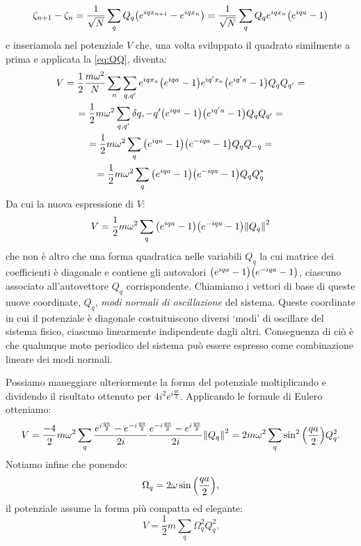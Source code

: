                 $$\zeta_{n+1}-\zeta_n=\frac{1}{\sqrt{N}}\sum_qQ_q\qty(e^{iqx_{n+1}}-e^{iqx_n})=\frac{1}{\sqrt{N}}\sum_qQ_qe^{iqx_n}\qty(e^{iqa}-1)$$
            e inseriamola nel potenziale $V$ che, una volta sviluppato il quadrato similmente a prima e applicata la \eqref{eq:QQ}, diventa:
            \begin{multline*}
                V=\frac{1}{2}\frac{m\omega^2}{N}\sum_n\sum_{q,q'}e^{iqx_n}\qty(e^{iqa}-1)e^{iq'x_n}\bigl(e^{iq'a}-1\bigr)Q_qQ_{q'}=\\=\frac{1}{2}m\omega^2\sum_{q,q'}\delta{q,-q'}\qty(e^{iqa}-1)\bigl(e^{iq'a}-1\bigr)Q_qQ_{q'}=\\=\frac{1}{2}m\omega^2\sum_q\qty(e^{iqa}-1)\qty(e^{-iqa}-1)Q_qQ_{-q}=\\=\frac{1}{2}m\omega^2\sum_q\qty(e^{iqa}-1)\qty(e^{-iqa}-1)Q_qQ_q^*
            \end{multline*}
            Da cui la nuova espressione di $V$:
            \begin{equation}
                V=\frac{1}{2}m\omega^2\sum_q\qty(e^{iqa}-1)\qty(e^{-iqa}-1)\norm{Q_q}^2
            \end{equation}
            che non \`e altro che una forma quadratica nelle variabili $Q_q$ la cui matrice dei coefficienti \`e diagonale e contiene gli autovalori $\qty(e^{iqa}-1)\qty(e^{-iqa}-1)$, ciascuno associato all'autovettore $Q_q$ corrispondente. Chiamiamo i vettori di base di queste nuove coordinate, $Q_q$, \emph{modi normali di oscillazione} del sistema. Queste coordinate in cui il potenziale \`e diagonale costuituiscono diversi `modi' di oscillare del sistema fisico, ciascuno linearmente indipendente dagli altri. Conseguenza di ci\`o \`e che qualunque moto periodico del sistema pu\`o essere espresso come combinazione lineare dei modi normali. \par Possiamo maneggiare ulteriormente la forma del potenziale moltiplicando e dividendo il risultato ottenuto per $\displaystyle 4i^2e^{i\frac{qa}{2}}$. Applicando le formule di Eulero otteniamo:
                $$V=\frac{-4}{2}m\omega^2\sum_q\frac{e^{i\frac{qa}{2}}-e^{-i\frac{qa}{2}}}{2i}\frac{e^{-i\frac{qa}{2}}-e^{i\frac{qa}{2}}}{2i}\norm{Q_q}^2=2m\omega^2\sum_q\sin^2\qty(\frac{qa}{2})Q_q^2.$$
            Notiamo infine che ponendo:
            \begin{equation}
                \Omega_q=2\omega\sin\qty(\frac{qa}{2}),
                \label{eq:dispersione:1}
            \end{equation}
            il potenziale assume la forma pi\`u compatta ed elegante:
            \begin{equation}
                V=\frac{1}{2}m\sum_q\Omega_q^2Q_q^2.
                \label{eq:potenziale:3}
            \end{equation}
